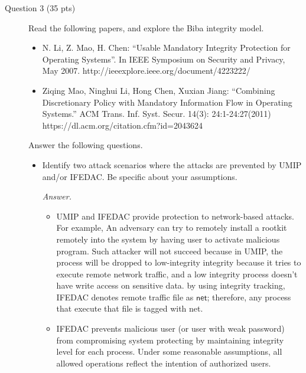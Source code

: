 \documentclass[11pt]{article}
\begin{document}
\begin{description}
 \item[Question 3 (35 pts)]Read the following papers, and explore the Biba integrity model. 
\begin{itemize}
 \item
N. Li, Z. Mao, H. Chen: ``Usable Mandatory Integrity Protection for Operating
Systems''.  In IEEE Symposium on Security and Privacy, May 2007.  
http://ieeexplore.ieee.org/document/4223222/

 \item
Ziqing Mao, Ninghui Li, Hong Chen, Xuxian Jiang: ``Combining Discretionary Policy with Mandatory Information Flow in Operating Systems.''
ACM Trans. Inf. Syst. Secur. 14(3): 24:1-24:27(2011)
https://dl.acm.org/citation.cfm?id=2043624
\end{itemize}

Answer the following questions. 
{\bf
\begin{itemize}
 \item
Identify two attack scenarios where the attacks are prevented by UMIP and/or IFEDAC.  Be specific about your assumptions.  
\begin{mdframed}
	\textit{Answer. } 
	\begin{itemize}
		\item 
		UMIP and IFEDAC provide protection to network-based attacks. For example,  An adversary can try to remotely install a rootkit remotely into the system by having user to activate malicious program. Such attacker will not succeed because in UMIP, the process will be dropped to low-integrity integrity because it tries to execute remote network traffic, and a low integrity process doesn't have write access on sensitive data. by using integrity tracking, IFEDAC denotes remote traffic file as $\mathsf{net}$; therefore, any process that execute that file is tagged with net.

		\item IFEDAC prevents malicious user (or user with weak password) from compromising system protecting by maintaining integrity level for each process. Under some reasonable assumptions, all allowed operations reflect the intention of authorized users.
	\end{itemize}


\end{mdframed}
\end{itemize}}
\end{description}
\end{document}
